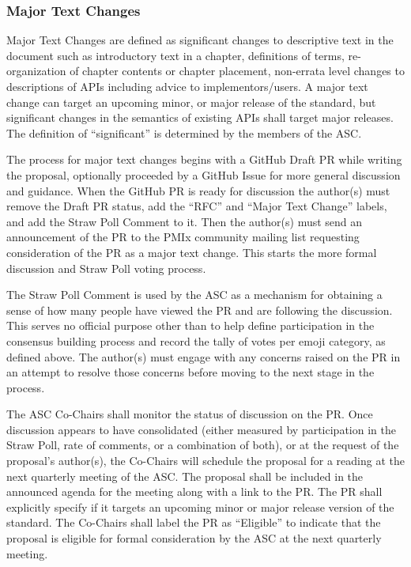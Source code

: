 \documentclass{article}
\begin{document}
\hypertarget{major-text-changes}{%
\subsubsection{Major Text Changes}%
\label{major-text-changes}}

Major Text Changes are defined as significant changes to descriptive text in
the document such as introductory text in a chapter, definitions of terms,
re-organization of chapter contents or chapter placement, non-errata level
changes to descriptions of APIs including advice to implementors/users.
A major text change can target an upcoming minor, or major release of the
standard, but significant changes in the semantics of existing
APIs shall target major releases. The definition of ``significant''
is determined by the members of the ASC.

The process for major text changes begins with a GitHub Draft PR while writing the proposal, optionally proceeded by a GitHub Issue for more general discussion and guidance.
When the GitHub PR is ready for discussion the author(s) must remove the Draft PR status, add the ``RFC'' and ``Major Text Change'' labels, and add the Straw Poll Comment to it.
Then the author(s) must send an announcement of the PR to the PMIx community mailing list requesting consideration of the PR as a major text change.
This starts the more formal discussion and Straw Poll voting process.

The Straw Poll Comment is used by the ASC as a mechanism for
obtaining a sense of how many people have viewed the PR and are
following the discussion. This serves no official purpose other than to
help define participation in the consensus building process and record
the tally of votes per emoji category, as defined above.
The author(s) must engage with any concerns raised on the PR in an attempt to
resolve those concerns before moving to the next stage in the process.

The ASC Co-Chairs shall monitor the status of discussion on the PR. Once
discussion appears to have consolidated (either measured by
participation in the Straw Poll, rate of comments, or a combination of
both), or at the request of the proposal's author(s), the Co-Chairs will
schedule the proposal for a reading at the next quarterly meeting of the
ASC. The proposal shall be included in the announced agenda for the
meeting along with a link to the PR. The PR shall explicitly specify if
it targets an upcoming minor or major release version of the standard.
The Co-Chairs shall label the PR as ``Eligible'' to indicate that the proposal is
eligible for formal consideration by the ASC at the next quarterly meeting.
\end{document}
